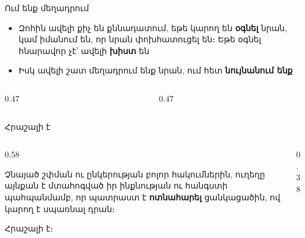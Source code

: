 \begin{frame}{Ում ենք մեղադրում}
  \begin{itemize}
    \item Զոհին ավելի քիչ են քննադատում, եթե կարող են \textbf{օգնել} նրան, կամ իմանում են, որ նրան փոխհատուցել են։ Եթե օգնել հնարավոր չէ՝ ավելի \textbf{խիստ} են
    \item<2-> Իսկ ավելի շատ մեղադրում ենք նրան, ում հետ \textbf{նույնանում ենք}
  \end{itemize}
  \begin{columns}[T]
    \begin{column}{0.47\textwidth}
    \end{column}
    \begin{column}{0.47\textwidth}
    \end{column}
  \end{columns}
  \vspace{2mm}
\end{frame}

\begin{frame}{Հրաշալի է}
  \begin{columns}[c]
    \begin{column}{0.58\textwidth}
      \begin{bookquote}
        Չնայած շփման ու ընկերության բոլոր հակումներին, ուղեղը այնքան է մտահոգված իր ինքնության ու հանգստի պահպանմամբ, որ պատրաստ է \textbf{ոտնահարել} ցանկացածին, ով կարող է սպառնալ դրան։\par\smallskip
        Հրաշալի է։
      \end{bookquote}
    \end{column}
    \begin{column}{0.38\textwidth}
      \centering{}
    \end{column}
  \end{columns}
\end{frame}
